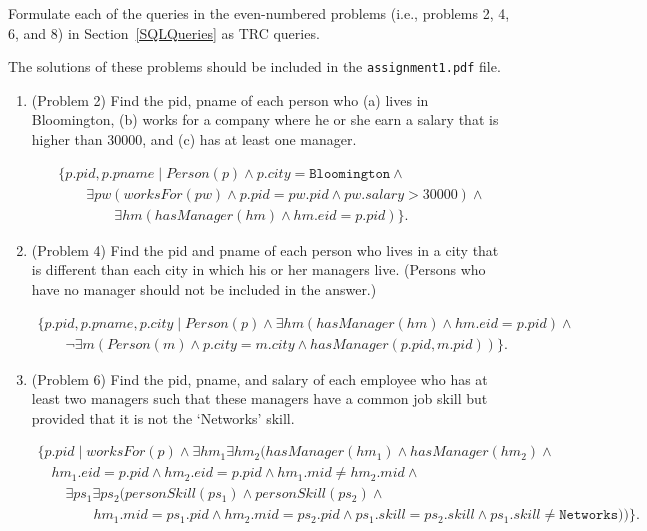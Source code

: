\documentclass{article}
\begin{document}
Formulate each of the queries in the even-numbered  problems (i.e., problems 2, 4, 6, and 8) in Section~\ref{SQLQueries} as TRC queries.

The solutions of these problems should be included in the {\tt assignment1.pdf} file.

\begin{enumerate}[resume]
\item (Problem 2) Find the pid, pname of each person who (a) lives in Bloomington, 
(b) works for a company where he or she earn a salary that is higher than 30000, and (c) has at least one manager.

$$
\begin{array}{l}
\{p.pid, p.pname\mid Person(p) \land p.city = \mathtt{Bloomington} \land \\
\qquad \exists pw (worksFor(pw) \land p.pid = pw.pid \land pw.salary > 30000) \land\\
\qquad\qquad \exists hm (hasManager(hm) \land hm.eid = p.pid)\}.
\end{array}
$$               

\item (Problem 4) Find the pid and pname of each person who lives in a city that is different than each city in which his or her managers live.
(Persons who have no manager should not be included in the answer.)

$$
\begin{array}{l}
\{p.pid, p.pname, p.city\mid Person(p) \land \exists hm (hasManager(hm) \land hm.eid =  p.pid) \land \\
\qquad \lnot\exists m(Person(m) \land p.city = m.city \land hasManager(p.pid, m.pid)) \}.
\end{array}
$$

\item (Problem 6) Find the pid, pname, and salary of each employee who has at least two managers such that these managers have a common job skill but provided that it is not the `Networks' skill.

$$
\begin{array}{l}
\{p.pid\mid worksFor(p) \land \exists hm_1\exists hm_2 (hasManager(hm_1)\land hasManager(hm_2) \land \\
\quad  hm_1.eid = p.pid \land hm_2.eid = p.pid \land hm_1.mid \neq hm_2.mid \land \\
\quad\quad \exists ps_1\exists ps_2(personSkill(ps_1)\land personSkill(ps_2) \land \\
\quad\qquad\quad hm_1.mid = ps_1.pid \land hm_2.mid = ps_2.pid \land ps_1.skill = ps_2.skill \land ps_1.skill \neq \mathtt{Networks}))\}.
\end{array}
$$


\end{enumerate}
\end{document}
